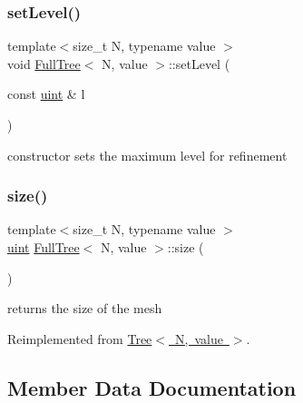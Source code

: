 \mbox{\label{classFullTree_a1f880ec827fcd885759f6eafc76048be}} 
\subsubsection{\texorpdfstring{set\+Level()}{setLevel()}}
{\footnotesize\ttfamily template$<$size\+\_\+t N, typename value $>$ \\
void \mbox{\hyperlink{classFullTree}{Full\+Tree}}$<$ N, value $>$\+::set\+Level (\begin{DoxyParamCaption}\item[{const \mbox{\hyperlink{definitions_8h_a69aa29b598b851b0640aa225a9e5d61d}{uint}} \&}]{l }\end{DoxyParamCaption})}

constructor sets the maximum level for refinement \mbox{\label{classFullTree_a13bb6b68dea0e36255dbd7b057110806}} 
\subsubsection{\texorpdfstring{size()}{size()}}
{\footnotesize\ttfamily template$<$size\+\_\+t N, typename value $>$ \\
\mbox{\hyperlink{definitions_8h_a69aa29b598b851b0640aa225a9e5d61d}{uint}} \mbox{\hyperlink{classFullTree}{Full\+Tree}}$<$ N, value $>$\+::size (\begin{DoxyParamCaption}{ }\end{DoxyParamCaption})\hspace{0.3cm}{\ttfamily [virtual]}}

returns the size of the mesh 

Reimplemented from \mbox{\hyperlink{classTree_a8af31c93aa821f0d853e920bcba1829a}{Tree$<$ N, value $>$}}.



\subsection{Member Data Documentation}
\mbox{\label{classFullTree_a4c87e86cce1c7f0f92651ad87d3823ec}} 
